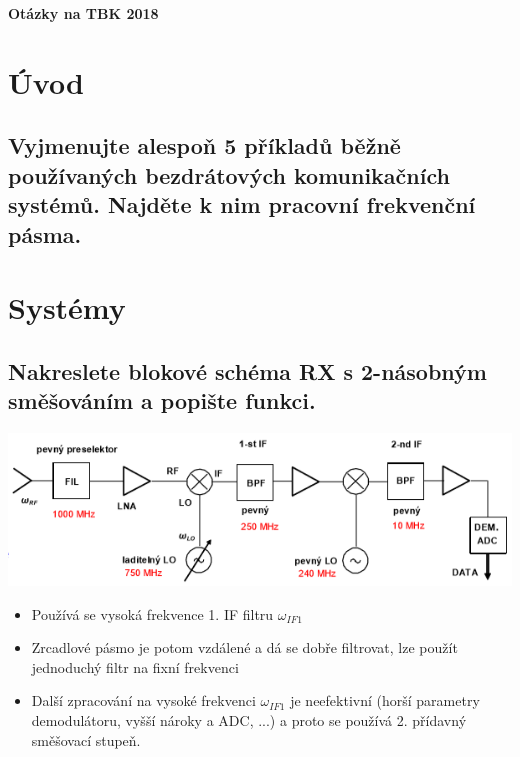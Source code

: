 \documentclass[a4paper]{article}
\begin{document}
\LARGE{\textbf{Otázky na TBK 2018}}
\newpage
\section{Úvod}
\subsection{\textbf{Vyjmenujte alespoň 5 příkladů běžně používaných bezdrátových komunikačních systémů. Najděte k nim pracovní frekvenční pásma.}}

\section{Systémy}
\subsection{\textbf{Nakreslete blokové schéma RX s 2-násobným směšováním a popište funkci.}}
\includegraphics{images/rx_2_nasobny.png}
\begin{itemize}
	\item Používá se vysoká frekvence 1. IF filtru $\omega_{IF1}$
	\item Zrcadlové pásmo je potom vzdálené a dá se dobře filtrovat, lze použít jednoduchý filtr na fixní frekvenci
	\item Další zpracování na vysoké frekvenci $\omega_{IF1}$ je neefektivní (horší parametry demodulátoru, vyšší nároky a ADC, ...) a proto se používá 2. přídavný směšovací stupeň.
\end{itemize}
\end{document}
